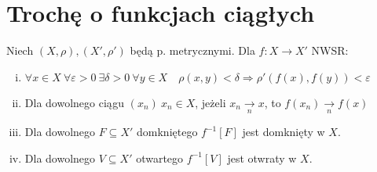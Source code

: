 \documentclass[twoside,10pt]{article}
\theoremstyle{definition}
\theoremstyle{definition}
\theoremstyle{definition}
\theoremstyle{definition}
\theoremstyle{remark}
\theoremstyle{definition}
\theoremstyle{definition}
\theoremstyle{definition}
\theoremstyle{definition}
\theoremstyle{definition}
\theoremstyle{definition}
\begin{document}
\section{Trochę o funkcjach ciągłych}
\begin{tw}[o ciągłości] 
    Niech $(X,\rho), (X',\rho ')$ będą p. metrycznymi. Dla $f: X \rightarrow X'$ NWSR:
    \begin{enumerate}[(i)]
        \item $\forall x \in X \ \forall \varepsilon > 0 \ \exists \delta > 0 \ \forall y \in X \quad \rho(x,y) < \delta \Rightarrow \rho'(f(x),f(y)) < \varepsilon$
        \item Dla dowolnego ciągu $(x_n) \ x_n \in X$, jeżeli $x_n \underset{n}{\rightarrow} x$, to $f(x_n) \underset{n}{\rightarrow} f(x)$
        \item Dla dowolnego $F \subseteq X'$ domkniętego $f^{-1}[F]$ jest domknięty w $X$.
        \item Dla dowolnego $V \subseteq X'$ otwartego $f^{-1}[V]$ jest otwraty w $X$.
    \end{enumerate}
\end{tw} 
\end{document}

